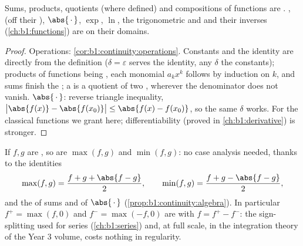 \begin{proposition}\label{prop:b1:continuity:algebra}
Sums, products, quotients (where defined) and compositions of
 functions are . , 
(off their ), $\abs{\,\cdot\,}$, $\exp$, $\ln$, the
trigonometric and  and their inverses
(\cref{ch:b1:functions}) are  on their domains.
\end{proposition}

\begin{proof}
Operations: \cref{cor:b1:continuity:operations}. Constants and
the identity are  directly from the definition
($\delta = \varepsilon$ serves the identity, any $\delta$ the
constants); products of  functions being ,
each monomial $a_k x^k$ follows by induction on $k$, and sums
finish the ; a  is a quotient of two
,  wherever the denominator does not
vanish. $\abs{\,\cdot\,}$: reverse triangle inequality,
$\bigl|\abs{f(x)} - \abs{f(x_0)}\bigr| \leq \abs{f(x) -
f(x_0)}$, so the same $\delta$ works. For the classical
functions we grant  here; differentiability (proved in
\cref{ch:b1:derivative}) is stronger.
\end{proof}

\begin{example}\label{ex:b1:continuity:maxmin}
If $f, g$ are , so are $\max(f, g)$ and $\min(f, g)$:
no case analysis needed, thanks to the identities
\[
\max(f, g) = \frac{f + g + \abs{f - g}}{2},
\qquad
\min(f, g) = \frac{f + g - \abs{f - g}}{2},
\]
and the  of sums and of $\abs{\,\cdot\,}$
(\cref{prop:b1:continuity:algebra}). In particular $f^+ =
\max(f, 0)$ and $f^- = \max(-f, 0)$ are  with $f =
f^+ - f^-$: the sign-splitting used for series
(\cref{ch:b1:series}) and, at full scale, in the integration
theory of the Year 3 volume, costs nothing in regularity.
\end{example}

